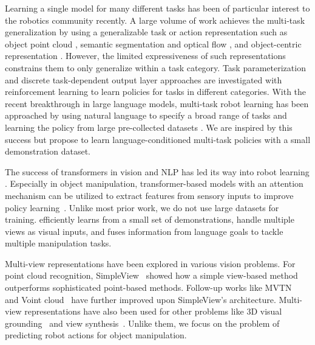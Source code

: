  Learning a single model for many different tasks has been of particular interest to the robotics community recently. A large volume of work achieves the multi-task generalization by using a generalizable task or action representation such as object point cloud \cite{huang2021generalization, chen2021system}, semantic segmentation and optical flow \cite{goyal2022ifor}, and object-centric representation \cite{lenz2015deep, saxena2006robotic}. However, the limited expressiveness of such representations constrains them to only generalize within a task category. Task parameterization \cite{deisenroth2014multi, kalashnikov2021mt} and discrete task-dependent output layer \cite{devin2017learning, teh2017distral} approaches are investigated with reinforcement learning to learn policies for tasks in different categories. With the recent breakthrough in large language models, multi-task robot learning has been approached by using natural language to specify a broad range of tasks and learning the policy from large pre-collected datasets \cite{saycan2022arxiv, rt12022arxiv, goyal2020rel3d, jang2021bcz, lynch2020language, mees2022matters, nair2022learning, reed2022generalist, singh2022progprompt}. We are inspired by this success but propose to learn language-conditioned multi-task policies with a small demonstration dataset.

 The success of transformers in vision and NLP has led its way into robot learning \citep{chaplot2021differentiable, clever2021assistive,johnson2021motion,yang2021learning}. Especially in object manipulation, transformer-based models with an attention mechanism can be utilized to extract features from sensory inputs to improve policy learning~\cite{cachet2020transformer,kim2021transformer,dasari2021transformers,jangir2022look,liu2022structformer}. Unlike most prior work, we do not use large datasets for training. \method efficiently learns from a small set of demonstrations, handle multiple views as visual inputs, and fuses information from language goals to tackle multiple manipulation tasks.

 Multi-view representations have been explored in various vision problems. For point cloud recognition, SimpleView~\cite{goyal2021revisiting} showed how a simple view-based method outperforms sophisticated point-based methods. Follow-up works like MVTN~\cite{hamdi2021mvtn} and Voint cloud~\cite{hamdi2021voint} have further improved upon SimpleView's architecture. Multi-view representations have also been used for other problems like 3D visual grounding~\cite{huang2022multi} and view synthesis~\cite{mildenhall2021nerf}. Unlike them, we focus on the problem of predicting robot actions for object manipulation.